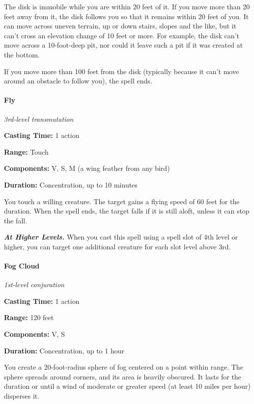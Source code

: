 \documentclass[
]{article}
\begin{document}
The disk is immobile while you are within 20 feet of it. If you move
more than 20 feet away from it, the disk follows you so that it remains
within 20 feet of you. It can move across uneven terrain, up or down
stairs, slopes and the like, but it can't cross an elevation change of
10 feet or more. For example, the disk can't move across a 10-foot-deep
pit, nor could it leave such a pit if it was created at the bottom.

If you move more than 100 feet from the disk (typically because it can't
move around an obstacle to follow you), the spell ends.

\hypertarget{fly}{%
\paragraph{Fly}\label{fly}}

\emph{3rd-level transmutation}

\textbf{Casting Time:} 1 action

\textbf{Range:} Touch

\textbf{Components:} V, S, M (a wing feather from any bird)

\textbf{Duration:} Concentration, up to 10 minutes

You touch a willing creature. The target gains a flying speed of 60 feet
for the duration. When the spell ends, the target falls if it is still
aloft, unless it can stop the fall.

\emph{\textbf{At Higher Levels.}} When you cast this spell using a spell
slot of 4th level or higher, you can target one additional creature for
each slot level above 3rd.

\hypertarget{fog-cloud}{%
\paragraph{Fog Cloud}\label{fog-cloud}}

\emph{1st-level conjuration}

\textbf{Casting Time:} 1 action

\textbf{Range:} 120 feet

\textbf{Components:} V, S

\textbf{Duration:} Concentration, up to 1 hour

You create a 20-foot-radius sphere of fog centered on a point within
range. The sphere spreads around corners, and its area is heavily
obscured. It lasts for the duration or until a wind of moderate or
greater speed (at least 10 miles per hour) disperses it.
\end{document}
